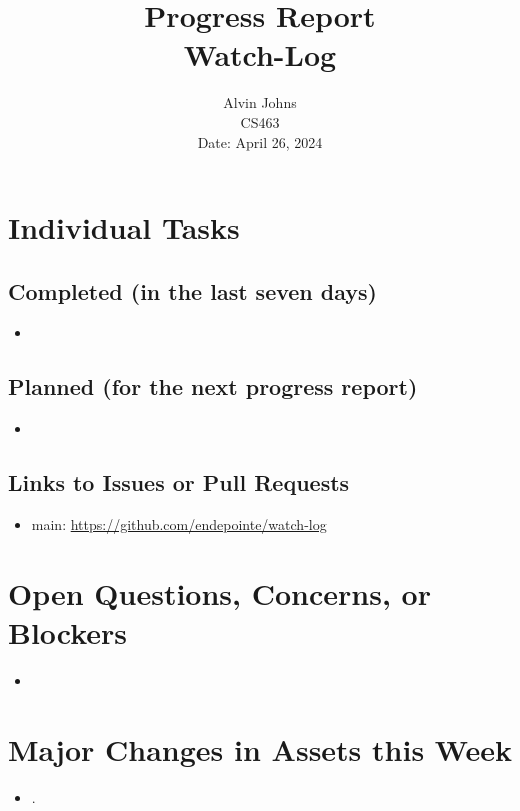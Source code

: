 \documentclass{article}
\title{Progress Report\\[0.5em]
\large Watch-Log}
\author{Alvin Johns\\
CS463\\
Date: April 26, 2024}
\date{}
\begin{document}
\maketitle

\section*{Individual Tasks}
\subsection*{Completed (in the last seven days)}
\begin{itemize}
    \item 
\end{itemize}

\subsection*{Planned (for the next progress report)}
\begin{itemize}
    \item
\end{itemize}

\subsection*{Links to Issues or Pull Requests}
\begin{itemize}
    \item main: \url{https://github.com/endepointe/watch-log}
\end{itemize}

\section*{Open Questions, Concerns, or Blockers}
\begin{itemize}
    \item
\end{itemize}

\section*{Major Changes in Assets this Week}
\begin{itemize}
    \item.
\end{itemize}
\end{document}
